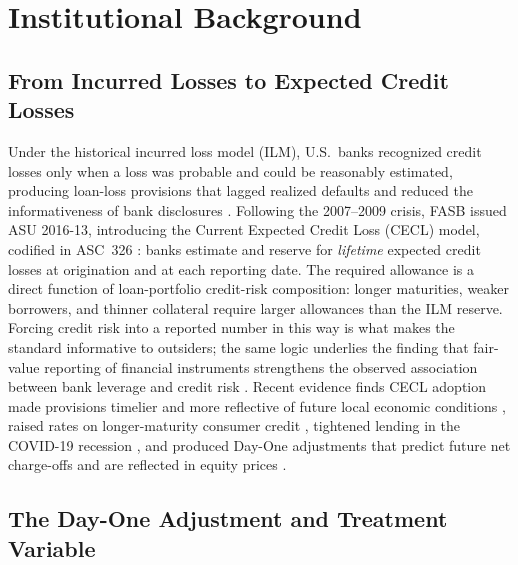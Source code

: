 \section{Institutional Background}
\label{sec:background}

\subsection{From Incurred Losses to Expected Credit Losses}
\label{sec:background:transition}

Under the historical incurred loss model (ILM), U.S.\ banks recognized
credit losses only when a loss was probable and could be reasonably
estimated, producing loan-loss provisions that lagged realized defaults
\citep{beatty2011delays} and reduced the informativeness of bank
disclosures \citep{bushman2012accounting, bushman2015delayed,
bischof2021accounting}.  Following
the 2007--2009 crisis, FASB issued ASU 2016-13, introducing the Current
Expected Credit Loss (CECL) model, codified in ASC~326
\citep{FASB2016}: banks estimate and reserve for \emph{lifetime}
expected credit losses at origination and at each reporting date.  The
required allowance is a direct function of loan-portfolio credit-risk
composition: longer maturities, weaker borrowers, and thinner collateral
require larger allowances than the ILM reserve.  Forcing credit risk
into a reported number in this way is what makes the standard
informative to outsiders; the same logic underlies the finding that
fair-value reporting of financial instruments strengthens the observed
association between bank leverage and credit risk
\citep{blankespoor2013fair}.  Recent evidence finds
CECL adoption made provisions timelier and more reflective of future
local economic conditions \citep{kim2026current}, raised rates on
longer-maturity consumer credit \citep{granja2025current}, tightened
lending in the COVID-19 recession \citep{chen2022does}, and produced
Day-One adjustments that predict future net charge-offs and are
reflected in equity prices \citep{gee2022decision}.

\subsection{The Day-One Adjustment and Treatment Variable}
\label{sec:background:dayone}

